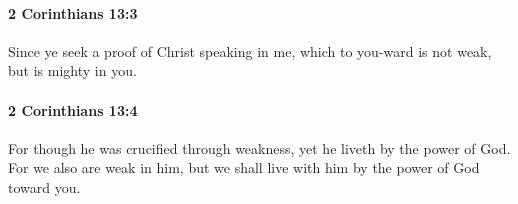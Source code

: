 		\paragraph{2 Corinthians 13:3} %
			\label{2CORINTHIANS-13-3}

			Since ye seek a proof of Christ speaking in me, which to you-ward is not weak, but is mighty in you.

			\begin{framed}
			\scriptsize
				\begin{compactdesc}
					\item[SBLG] 
				\end{compactdesc}
			\end{framed}

		\paragraph{2 Corinthians 13:4} %
			\label{2CORINTHIANS-13-4}

			For though he was crucified through weakness, yet he liveth by the power of God.  For we also are weak in him, but we shall live with him by the power of God toward you.

